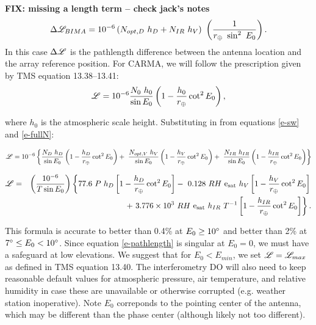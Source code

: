 \documentclass[preprint]{aastex}
\newcommand{\rearth}{  %
   \ifmmode{r_\oplus}
   \else{$r_\oplus$}
   \fi}
\newcommand{\scrL}{ %
   \ifmmode{{\mathscr L}}
   \else{${\mathscr L}$\/}
   \fi}
\def\degree{\ifmmode{^\circ} \else{$^\circ$}\fi}
\def\nexpo#1#2{\ifmmode{#1 \times 10^{#2}}\else{$#1 \times 10^{#2}$}\fi}
\def\expo#1{\ifmmode{10^{#1}}\else{$10^{#1}$}\fi}
\def\esat{\ifmmode{\rm e_{sat}}\else{e$_{sat}$}\fi}
\begin{document}
{\bf FIX: missing a length term -- check jack's notes }
\begin{equation} 
\Delta\scrL_{BIMA} =  \expo{-6} \left( N_{opt,D}~h_D + N_{IR}~h_V \right)~
\left(\frac{1}{\rearth~\sin^2~E_0}\right) .
\label{e-BIMApathlength}
\end{equation}
\noindent In this case $\Delta\scrL$ is the pathlength difference between the 
antenna location and the array reference position.
For CARMA, we will follow the prescription given by TMS equation 13.38--13.41:
\begin{equation}
\scrL = 10^{-6} 
\frac{N_0~h_0}{\sin E_0} \left(1 - \frac{h_0}{\rearth} \cot^2 E_0 \right),
\end{equation}

\noindent where $h_0$ is the atmospheric scale height. Substituting in from equations \ref{e-sw} and \ref{e-fullN}:

\begin{equation}
\scrL  = 10^{-6} 
\left\{
\frac{N_D~h_D}{\sin E_0} \left(1 - \frac{h_D}{\rearth} \cot^2 E_0 \right) 
 +~\frac{N_{opt,V}~h_V}{\sin E_0} \left(1 - \frac{h_V}{\rearth} \cot^2 E_0 \right) 
 +~\frac{N_{IR}~h_{IR}}{\sin E_0} \left(1 - \frac{h_{IR}}{\rearth} \cot^2 E_0 \right)
\right\}
 \label{e-pathlength}
\end{equation}

\begin{eqnarray*}
{\mathscr L} &=& \left(\frac{10^{-6}}{T \sin E_0}\right) 
  \left\{ 
    77.6~P~h_D \left[ 1 - \frac{h_D}{\rearth} \cot^2 E_0 \right]
 -~0.128~RH~\esat~h_V \left[ 1 - \frac{h_V}{\rearth} \cot^2 E_0 \right]
\right. \\
 & & \left. 
 +~\nexpo{3.776}{3}~RH~\esat~h_{IR}~T^{-1} \left[ 1 - \frac{h_{IR}}{\rearth} \cot^2 E_0 \right]
  \right\}. 
\end{eqnarray*}

\noindent This formula is accurate to better than 0.4\% at
$E_0 \ge 10\degree$ and better than 2\% at $ 7\degree \le E_0 < 10\degree$.
Since equation \ref{e-pathlength} is singular at $E_0 = 0$, we must have
a safeguard at low elevations. We suggest that for $E_0 < E_{min}$, we
set $\scrL = \scrL_{max}$ as defined in TMS equation 13.40.
The interferometry DO will also need to keep reasonable default values
for atmospheric pressure, air temperature, and relative humidity in case these
are unavailable or otherwise corrupted (e.g. weather station inoperative).
Note $E_0$ correponds to the pointing center of the antenna, which
may be different than the phase center (although likely not too different).
\end{document}
